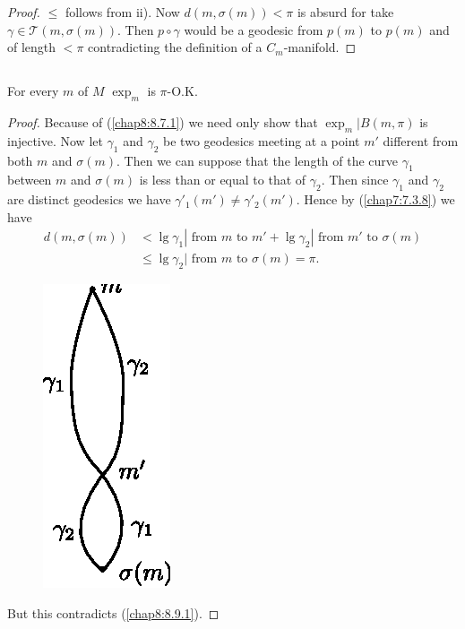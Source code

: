 \begin{proof}
$\leq$ follows from ii). Now $d(m,\sigma(m))<\pi$ is absurd for take
  $\gamma\in\mathscr{T}(m,\sigma(m))$. Then $p\circ\gamma$ would be a
  geodesic from $p(m)$ to $p(m)$ and of length $<\pi$ contradicting
  the definition of a $C_{m}$-manifold.
\end{proof}

\subsection{}\label{chap8:8.9.2}

\begin{lemma*}
For every $m$ of $M$ $\exp_{m}$ is $\pi$-O.K.
\end{lemma*}

\begin{proof}
Because of (\ref{chap8:8.7.1}) we need only show that $\exp_{m}|B(m,\pi)$
is injective. Now let $\gamma_{1}$ and $\gamma_{2}$ be two geodesics
meeting at a point $m'$ different from both $m$ and $\sigma(m)$. Then
we can suppose that the length of the curve $\gamma_{1}$ between $m$
and $\sigma(m)$ is less than or equal to that of $\gamma_{2}$. Then
since $\gamma_{1}$ and $\gamma_{2}$ are distinct geodesics we have
$\gamma'_{1}(m')\neq \gamma'_{2}(m')$. Hence by (\ref{chap7:7.3.8}) we
have
\begin{align*}
d(m,\sigma(m)) &< \lg\gamma_{1}|\text{ from } m \text{ to }
m'+\lg\gamma_{2}|\text{ from $m'$ to } \sigma(m)\\
&\leq \lg\gamma_{2}|\text{ from $m$ to } \sigma(m)=\pi.
\end{align*}
\begin{figure}[H]
\centering
\includegraphics{figures/chap8-fig2.eps}
\end{figure}

\noindent
But \pageoriginale this contradicts (\ref{chap8:8.9.1}).
\end{proof}

